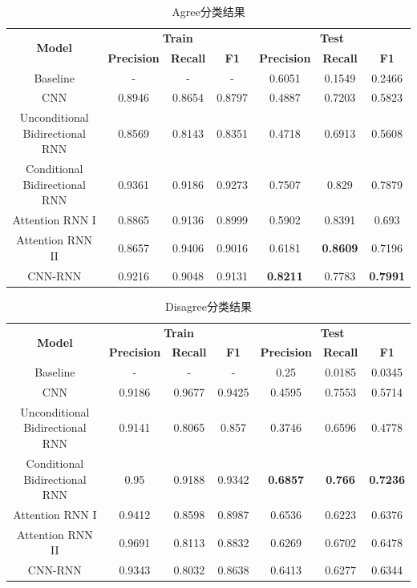 \documentclass[a4paper]{article}
\begin{document}
	\begin{table}[H]
	\centering
	\caption{Agree分类结果}
	\label{agree}
	\begin{tabular}{@{}ccccccc@{}}
		\toprule
		\multirow{2}{*}{\textbf{Model}} & \multicolumn{3}{c}{\textbf{Train}} & \multicolumn{3}{c}{\textbf{Test}} \\ \cmidrule(l){2-7} 
		& \textbf{Precision}       & \textbf{Recall}      & \textbf{F1}      & \textbf{Precision}      & \textbf{Recall}      & \textbf{F1}      \\ \cmidrule(l){1-7}
		Baseline & - & - & - &0.6051 & 0.1549 & 0.2466 \\
		CNN&0.8946&0.8654&0.8797&0.4887&0.7203&0.5823\\
		Unconditional Bidirectional RNN&0.8569&0.8143&0.8351&0.4718&0.6913&0.5608\\
		Conditional Bidirectional RNN&0.9361&0.9186&0.9273&0.7507&0.829&0.7879\\
		Attention RNN I&0.8865&0.9136&0.8999&0.5902&0.8391&0.693\\
		Attention RNN II&0.8657&0.9406&0.9016&0.6181&\textbf{0.8609}&0.7196\\
		CNN-RNN&0.9216&0.9048&0.9131&\textbf{0.8211}&0.7783&\textbf{0.7991}\\
		\bottomrule
	\end{tabular}
	\end{table}
	\begin{table}[H]
		\centering
		\caption{Disagree分类结果}
		\label{disagree}
		\begin{tabular}{@{}ccccccc@{}}
			\toprule
			\multirow{2}{*}{\textbf{Model}} & \multicolumn{3}{c}{\textbf{Train}} & \multicolumn{3}{c}{\textbf{Test}} \\ \cmidrule(l){2-7} 
			& \textbf{Precision}       & \textbf{Recall}      & \textbf{F1}      & \textbf{Precision}      & \textbf{Recall}      & \textbf{F1}      \\ \cmidrule(l){1-7}
			Baseline & -& -& -&0.25 & 0.0185 & 0.0345 \\
			CNN&0.9186&0.9677&0.9425&0.4595&0.7553&0.5714\\
			Unconditional Bidirectional RNN&0.9141&0.8065&0.857&0.3746&0.6596&0.4778\\
			Conditional Bidirectional RNN&0.95&0.9188&0.9342&\textbf{0.6857}&\textbf{0.766}&\textbf{0.7236}\\
			Attention RNN I&0.9412&0.8598&0.8987&0.6536&0.6223&0.6376\\
			Attention RNN II&0.9691&0.8113&0.8832&0.6269&0.6702&0.6478\\
			CNN-RNN&0.9343&0.8032&0.8638&0.6413&0.6277&0.6344\\
			\bottomrule
		\end{tabular}
	\end{table}
\end{document}
